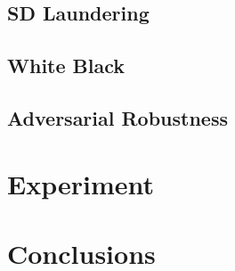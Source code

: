 \documentclass[conference]{IEEEtran} %
\begin{document}
    \subsection{SD Laundering}
    \subsection{White Black}
    \subsection{Adversarial Robustness}
\section{Experiment}
\section{Conclusions}

\end{document}
